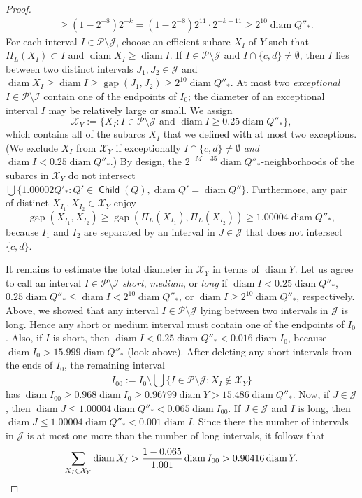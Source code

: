 \documentclass[12pt]{amsart}
\numberwithin{equation}{section}
\theoremstyle{plain}
\theoremstyle{definition}
\newcommand{\diam}{\mathop\mathrm{diam}\nolimits}
\newcommand{\Child}{\mathop\mathsf{Child}\nolimits}
\newcommand{\gap}{\mathop\mathrm{gap}\nolimits}
\numberwithin{figure}{section}
\begin{document}
\begin{proof}
\begin{align*}
&\geq (1-2^{-8})2^{-k}=(1-2^{-8})2^{11}\cdot 2^{-k-11}\geq 2^{10}\diam Q''_*.\end{align*} For each interval $I\in\mathcal{P}\setminus\mathcal{J}$, choose an efficient subarc $X_I$ of $Y$ such that $\Pi_L(X_I)\subset I$ and $\diam X_I\geq \diam I$. If $I\in\mathcal{P}\setminus\mathcal{J}$ and $I\cap\{c,d\}\neq\emptyset$, then $I$ lies between two distinct intervals $J_1,J_2\in\mathcal{J}$ and $\diam X_I\geq \diam I\geq \gap(J_1,J_2)\geq 2^{10}\diam Q''_*$. At most two \emph{exceptional} $I\in\mathcal{P}\setminus\mathcal{I}$ contain one of the endpoints of $I_0$; the diameter of an exceptional interval $I$ may be relatively large or small. We assign $$\mathcal{X}_Y:=\{X_I:I\in\mathcal{P}\setminus\mathcal{J}\text{ and }\diam I\geq 0.25\diam Q''_*\},$$ which contains all of the subarcs $X_I$ that we defined with at most two exceptions. (We exclude $X_I$ from $\mathcal{X}_Y$ if exceptionally $I\cap \{c,d\}\neq\emptyset$ \emph{and} $\diam I<0.25\diam Q''_*$.) By design, the $2^{-M-35}\diam Q''_*$-neighborhoods of the subarcs in $\mathcal{X}_Y$ do not intersect $\bigcup\{1.00002Q'_*:Q'\in\Child(Q), \diam Q'=\diam Q''\}$. Furthermore, any pair of distinct $X_{I_1},X_{I_2}\in\mathcal{X}_Y$ enjoy $$\gap(X_{I_1},X_{I_2})\geq \gap(\Pi_L(X_{I_1}),\Pi_L(X_{I_2}))\geq 1.00004\diam Q''_*,$$ because $I_1$ and $I_2$ are separated by an interval in $J\in \mathcal{J}$ that does not intersect $\{c,d\}$.

It remains to estimate the total diameter in $\mathcal{X}_Y$ in terms of $\diam Y$. Let us agree to call an interval $I\in\mathcal{P}\setminus\mathcal{I}$ \emph{short}, \emph{medium}, or \emph{long} if $\diam I<0.25\diam Q''_*$, $0.25\diam Q''_*\leq \diam I<2^{10}\diam Q''_*$, or $\diam I\geq 2^{10}\diam Q''_*$, respectively. Above, we showed that any interval $I\in\mathcal{P}\setminus\mathcal{J}$ lying between two intervals in $\mathcal{J}$ is long. Hence any short or medium interval must contain one of the endpoints of $I_0$. Also, if $I$ is short, then $\diam I<0.25\diam Q''_*<0.016\diam I_0$, because $\diam I_0>15.999\diam Q''_*$ (look above).
After deleting any short intervals from the ends of $I_0$, the remaining interval $$I_{00}:=\overline{I_0\setminus\bigcup\{I\in\mathcal{P}\setminus\mathcal{J}:X_I\not\in\mathcal{X}_Y\}}$$ has $\diam I_{00}\geq 0.968\diam I_0\geq 0.96799\diam Y> 15.486\diam Q''_*$. Now, if $J\in\mathcal{J}$, then $\diam J \le 1.00004\diam Q''_*<0.065\diam I_{00}$. If $J\in\mathcal{J}$ and $I$ is long, then $\diam J\leq 1.00004\diam Q''_*<0.001\diam I$. Since there the number of intervals in $\mathcal{J}$ is at most one more than the number of long intervals, it follows that \begin{equation*}\sum_{X_I\in\mathcal{X}_Y}\diam X_I >  \frac{1-0.065}{1.001}\diam I_{00} > 0.90416\diam Y. \qedhere\end{equation*}
\end{proof}
\end{document}
